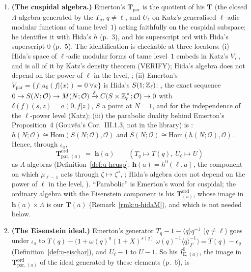 \documentclass[11pt]{article}
\newcommand{\VERIFYloc}{\textsf{VERIFY}}          %
\newcommand{\Iw}{\Lambda}                         %
\newcommand{\hcusp}{\mathbf{h}}                   %
\newcommand{\Tu}{\mathbf{T}}                      %
\newcommand{\Eis}{\mathrm{E}}
\newcommand{\ee}{\epsilon}                        %
\newcommand{\Zl}{\Z_\ell}
\begin{document}
\begin{lemma}
\begin{enumerate}
\item \textbf{(The cuspidal algebra.)} Emerton's $\mathbf T_{\mathrm{par}}$ is the quotient of his $\mathbf T$ (the closed $\Iw$-algebra generated by
  the $T_q$, $q\ne\ell$, and $U_\ell$ on Katz's generalised $\ell$-adic modular functions of tame level~$1$) acting faithfully on the cuspidal subspace;
  he identifies it with Hida's $h$ (p.~3), and his superscript ord with Hida's superscript $0$ (p.~5). The identification is checkable at three
  locators: (i) Hida's space of $\ell$-adic modular forms of tame level~$1$ embeds in Katz's $V$, \cite[(1.11a), p.~240]{hida_ens}, and is all of it by
  Katz's density theorem (\VERIFYloc); Hida's algebra does not depend on the power of $\ell$ in the level, \cite[(1.15a), p.~243]{hida_ens}; (ii) Emerton's
  $V_{\mathrm{par}}=\{f:a_0(f|\langle x\rangle)=0\ \forall x\}$ is Hida's $S(1;\Zl)$: \cite[Thm.~2.2, p.~20]{hida_aif2}, the exact sequence
  $0\to S(N;\mathcal O)\to M(N;\mathcal O)\xrightarrow{\delta}C(S\times\mathbb{Z}_\ell^\times;\mathcal O)\to0$ with $\delta(f)(s,z)=a(0,f|z)$, $S$ a point at $N=1$, and
  \cite[(1.2), p.~9; (1.3), p.~10]{hida_aif2} for the independence of the $\ell$-power level (Katz); (iii) the parabolic duality behind Emerton's
  Proposition~4 (Gouv\^ea's Cor.~III.1.3, not in the library) is \cite[Thm.~1.3, p.~17]{hida_aif2}: $h(N;\mathcal O)\cong\mathrm{Hom}(S(N;\mathcal O),\mathcal O)$
  and $S(N;\mathcal O)\cong\mathrm{Hom}(h(N;\mathcal O),\mathcal O)$. Hence, through $\iota_a$,
  \[
    \mathbf T^{\mathrm{ord}}_{\mathrm{par},(a)}\;=\;\hcusp(a)\qquad(T_q\mapsto T(q),\ U_\ell\mapsto U)
  \]
  as $\Iw$-algebras (Definition~\ref{def:u-hcusp}: $\hcusp(a)=h^{0}(\ell,a)$, the component on which $\mu_{\ell-1}$ acts through $\zeta\mapsto\zeta^{a}$,
  \cite[p.~249]{hida_ens}; Hida's algebra does not depend on the power of $\ell$ in the level, \cite[(1.19)]{hida_ens}). ``Parabolic'' is Emerton's
  word for cuspidal; the ordinary algebra with the Eisenstein component is his $\mathbf T^{\mathrm{ord}}_{(a)}$, whose image in $\hcusp(a)\times\Iw$
  is our $\Tu(a)$ (Remark~\ref{rmk:u-hidaM}), and which is not needed below.
\item \textbf{(The Eisenstein ideal.)} Emerton's generator $T_q-1-\langle q\rangle q^{-1}$ ($q\ne\ell$) goes under $\iota_a$ to
  $T(q)-\bigl(1+\omega(q)^{a}(1+X)^{s(q)}\,\omega(q)^{-1}\langle q\rangle_\Gamma^{-1}\bigr)=T(q)-\ee_q$ (Definition~\ref{def:u-eischar}), and $U_\ell-1$ to
  $U-1$. So his $I^{0}_{\Eis,(a)}$, the image in $\mathbf T^{\mathrm{ord}}_{\mathrm{par},(a)}$ of the ideal generated by these elements (p.~6), is

\end{enumerate}
\end{lemma}
\end{document}
